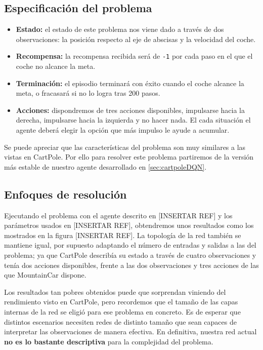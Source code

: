 \subsection{Especificación del problema}

\begin{itemize}
    \item \textbf{Estado:} el estado de este problema nos viene dado a través de dos observaciones: la posición respecto al eje de abscisas y la velocidad del coche.
    \item \textbf{Recompensa:} la recompensa recibida será de \texttt{-1} por cada paso en el que el coche no alcance la meta.
    \item \textbf{Terminación:} el episodio terminará con éxito cuando el coche alcance la meta, o fracasará si no lo logra tras 200 pasos.
    \item \textbf{Acciones:} dispondremos de tres acciones disponibles, impulsarse hacia la derecha, impulsarse hacia la izquierda y no hacer nada. El cada situación el agente deberá elegir la opción que más impulso le ayude a acumular.
\end{itemize}

Se puede apreciar que las características del problema son muy similares a las vistas en CartPole. Por ello para resolver este problema partiremos de la versión más estable de nuestro agente desarrollado en \ref{sec:cartpoleDQN}.


\subsection{Enfoques de resolución}

Ejecutando el problema con el agente descrito en [INSERTAR REF] y los parámetros usados en [INSERTAR REF], obtendremos unos resultados como los mostrados en la figura [INSERTAR REF]. La topología de la red también se mantiene igual, por supuesto adaptando el número de entradas y salidas a las del problema; ya que CartPole describía su estado a través de cuatro observaciones y tenía dos acciones disponibles, frente a las dos observaciones y tres acciones de las que MountainCar dispone.

Los resultados tan pobres obtenidos puede que sorprendan viniendo del rendimiento visto en CartPole, pero recordemos que el tamaño de las capas internas de la red se eligió para ese problema en concreto. Es de esperar que distintos escenarios necesiten redes de distinto tamaño que sean capaces de interpretar las observaciones de manera efectiva. En definitiva, nuestra red actual \textbf{no es lo bastante descriptiva} para la complejidad del problema.

